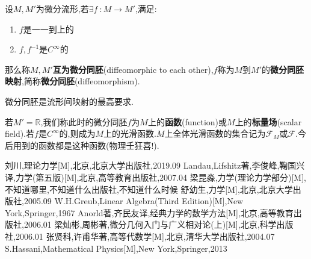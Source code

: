 \documentclass[UTF8]{article}
\begin{document}
	\begin{diffeomorphicToEachOther}
		
		设$M,M'$为微分流形,若$\exists f~: M \to M'$,满足:
		
		\begin{enumerate}
			
			\item $f$是一一到上的
			
			\item $f,f^{-1}$是$C^{\infty}$的
			
		\end{enumerate}
		
		那么称$M,M'$\textbf{互为微分同胚}(diffeomorphic to each other),$f$称为$M$到$M'$的\textbf{微分同胚映射},简称\textbf{微分同胚}(diffeomorphism).
		
	\end{diffeomorphicToEachOther}
	
	微分同胚是流形间映射的最高要求.
	
	若$M' = \mathbb{R}$,我们称此时的微分同胚$f$为$M$上的\textbf{函数}(function)或$M$上的\textbf{标量场}(scalar field).若$f$是$C^{\infty}$的,则成为$M$上的光滑函数.$M$上全体光滑函数的集合记为$\mathscr{F}_{M}$或$\mathscr{F}$.今后用到的函数都是这种函数(物理壬狂喜!).
	
	
	
	\newpage
	
	\begin{thebibliography}{?}
		 刘川,理论力学[M],北京,北京大学出版社,2019.09
		 Landau,Lifshitz著,李俊峰,鞠国兴译,力学(第五版)[M],北京,高等教育出版社,2007.04
		 梁昆淼,力学(理论力学部分)[M],不知道哪里,不知道什么出版社,不知道什么时候
		 舒幼生,力学[M],北京,北京大学出版社,2005.09
		 W.H.Greub,Linear Algebra(Third Edition)[M],New York,Springer,1967
		 Anorld著,齐民友译,经典力学的数学方法[M],北京,高等教育出版社,2006.01
		 梁灿彬,周彬著,微分几何入门与广义相对论(上)[M],北京,科学出版社,2006.01
		 张贤科,许甫华著,高等代数学[M],北京,清华大学出版社,2004.07
		 S.Hassani,Mathematical Physics[M],New York,Springer,2013
	\end{thebibliography}
	
	
	
	
	
	
\end{document}
